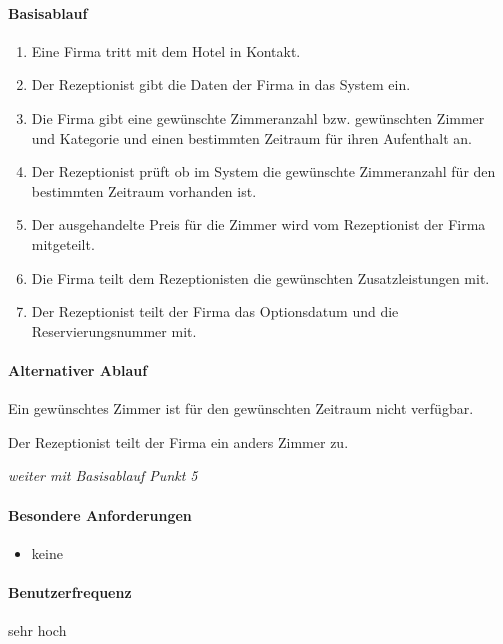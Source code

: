 \paragraph{Basisablauf}
\begin{enumerate}
	\item Eine Firma tritt mit dem Hotel in Kontakt.
	\item Der \Gls{Rezeptionist} gibt die Daten der Firma in das System ein.
	\item Die Firma gibt eine gewünschte Zimmeranzahl bzw. gewünschten \Gls{Zimmer} und Kategorie und einen bestimmten Zeitraum für ihren \Gls{Aufenthalt} an. 
    \item Der \Gls{Rezeptionist} prüft ob im System die gewünschte Zimmeranzahl für den bestimmten Zeitraum vorhanden ist. 
	\item Der ausgehandelte Preis für die \Gls{Zimmer} wird vom \Gls{Rezeptionist} der Firma mitgeteilt.
	\item Die Firma teilt dem \Gls{Rezeptionist}en die gewünschten Zusatzleistungen mit.
	\item Der \Gls{Rezeptionist} teilt der Firma das Optionsdatum und die Reservierungsnummer mit.
\end{enumerate}

\paragraph{Alternativer Ablauf}
\begin{longenum}
	\item
	\item
	\item
	\item
	\begin{longenum}
		\item Ein gewünschtes \Gls{Zimmer} ist für den gewünschten Zeitraum nicht verfügbar.
		\begin{longenum}
			\item Der \Gls{Rezeptionist} teilt der Firma ein anders \Gls{Zimmer} zu.
			\item \emph{weiter mit Basisablauf Punkt 5}
		\end{longenum}
	\end{longenum}
	\item
	\item
	\item
\end{longenum}

\paragraph{Besondere Anforderungen}
\begin{itemize}
	\item keine
\end{itemize}

\paragraph{Benutzerfrequenz}
sehr hoch

\newpage

